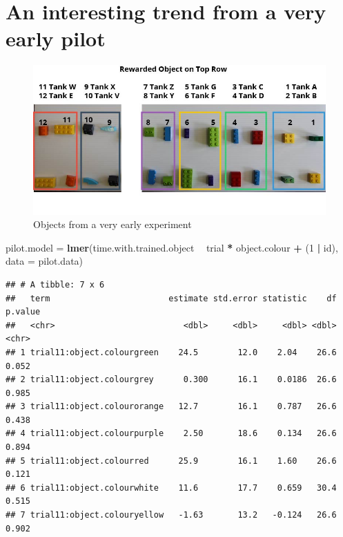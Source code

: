 \documentclass[]{book}
\newenvironment{Shaded}{\begin{snugshade}}{\end{snugshade}}
\newcommand{\KeywordTok}[1]{\textcolor[rgb]{0.13,0.29,0.53}{\textbf{#1}}}
\newcommand{\DataTypeTok}[1]{\textcolor[rgb]{0.13,0.29,0.53}{#1}}
\newcommand{\DecValTok}[1]{\textcolor[rgb]{0.00,0.00,0.81}{#1}}
\newcommand{\StringTok}[1]{\textcolor[rgb]{0.31,0.60,0.02}{#1}}
\newcommand{\OperatorTok}[1]{\textcolor[rgb]{0.81,0.36,0.00}{\textbf{#1}}}
\newcommand{\NormalTok}[1]{#1}
\begin{document}
\chapter{An interesting trend from a very early
pilot}\label{an-interesting-trend-from-a-very-early-pilot}

\begin{figure}
\centering
\includegraphics{images/objects.jpg}
\caption{Objects from a very early experiment}
\end{figure}

\begin{Shaded}
\begin{Highlighting}[]
\NormalTok{pilot.model =}\StringTok{ }
\StringTok{  }\KeywordTok{lmer}\NormalTok{(time.with.trained.object }\OperatorTok{~}\StringTok{ }\NormalTok{trial }\OperatorTok{*}\StringTok{ }\NormalTok{object.colour }\OperatorTok{+}\StringTok{ }\NormalTok{(}\DecValTok{1} \OperatorTok{|}\StringTok{ }\NormalTok{id), }
       \DataTypeTok{data =}\NormalTok{ pilot.data)}
\end{Highlighting}
\end{Shaded}

\begin{verbatim}
## # A tibble: 7 x 6
##   term                        estimate std.error statistic    df p.value
##   <chr>                          <dbl>     <dbl>     <dbl> <dbl> <chr>  
## 1 trial11:object.colourgreen    24.5        12.0    2.04    26.6 0.052  
## 2 trial11:object.colourgrey      0.300      16.1    0.0186  26.6 0.985  
## 3 trial11:object.colourorange   12.7        16.1    0.787   26.6 0.438  
## 4 trial11:object.colourpurple    2.50       18.6    0.134   26.6 0.894  
## 5 trial11:object.colourred      25.9        16.1    1.60    26.6 0.121  
## 6 trial11:object.colourwhite    11.6        17.7    0.659   30.4 0.515  
## 7 trial11:object.colouryellow   -1.63       13.2   -0.124   26.6 0.902
\end{verbatim}
\end{document}

